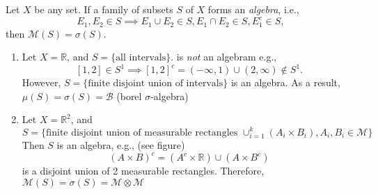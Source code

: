 \begin{theorem}
Let $X$ be any set.
If a family of subsets $S$ of $X$ forms an \emph{algebra}, i.e.,
\[
E_1,E_2\in S\implies E_1\cup E_2\in S,E_1\cap E_2\in S,E_1^c\in S,
\]
then $\mathcal{M}(S)=\sigma(S)$.
\end{theorem}

\begin{example}
\begin{enumerate}
\item
Let $X=\mathbb{R}$, and $S=\{\text{all intervals}\}$.
is \emph{not} an algebram e.g.,
\[
[1,2]\in S^1\implies [1,2]^c = (-\infty,1)\cup(2,\infty)\notin S^1.
\]
However, $S=\{\text{finite disjoint union of intervals}\}$ is an algebra.
As a result, $\mu(S)=\sigma(S)=\mathcal{B}$ (borel $\sigma$-algebra)
\item
Let $X=\mathbb{R}^2$, and 
\[
S=\{\text{finite disjoint union of measurable rectangles }\cup_{i=1}^k(A_i\times B_i), A_i,B_i\in\mathcal{M}\}
\]
Then $S$ is an algebra, e.g., (see figure)
\[
(A\times B)^c = (A^c\times \mathbb{R})\cup(A\times B^c)
\]
is a disjoint union of 2 measurable rectangles.
Therefore, $\mathcal{M}(S)=\sigma(S)=\mathcal{M}\otimes\mathcal{M}$
\end{enumerate}
\end{example}

